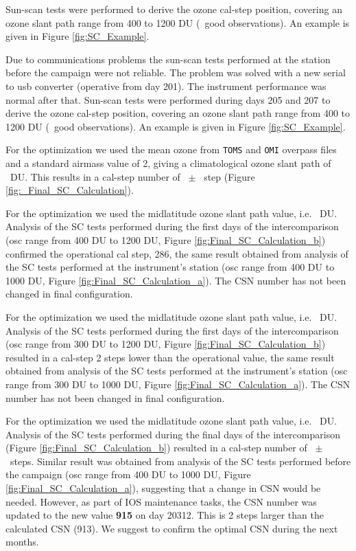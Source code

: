 Sun-scan tests were performed to derive the ozone cal-step position, covering an ozone slant path range from 400 to 1200 DU (\textbf{\numSCnew}\ good observations). An example is given in Figure \ref{fig:SC_Example}.

Due to communications problems the sun-scan tests performed at the station  before the campaign were not reliable. The problem was solved with a new serial to usb converter (operative from day 201). The instrument performance was normal after that. Sun-scan tests were performed during days 205 and 207 to derive the ozone cal-step position, covering an ozone slant path range from 400 to 1200 DU (\textbf{\numSCnew}\ good observations). An example is given in Figure \ref{fig:SC_Example}.


For the optimization we used the mean ozone from \texttt{TOMS} and \texttt{OMI} overpass files and a standard airmass value of 2, giving a climatological ozone slant path of \textbf{\STATIONOSC}\ DU. This results in a cal-step number of \textbf{\CALCSTEP}\ $\pm$ \textbf{\calsteperror}\ step (Figure \ref{fig:_Final_SC_Calculation}).

For the optimization we used the midlatitude ozone slant path value, i.e. \textbf{\STATIONOSC}\ DU. Analysis of the SC tests performed during the first days of the intercomparison (osc range from 400 DU to 1200 DU, Figure \ref{fig:Final_SC_Calculation_b}) confirmed the operational cal step, 286, the same result obtained from analysis of the SC tests performed at the instrument's station (osc range from 400 DU to 1000 DU, Figure \ref{fig:Final_SC_Calculation_a}). The CSN number has not been changed in final configuration.

For the optimization we used the midlatitude ozone slant path value, i.e. \textbf{\STATIONOSC}\ DU. Analysis of the SC tests performed during the first days of the intercomparison (osc range from 300 DU to 1200 DU, Figure \ref{fig:Final_SC_Calculation_b}) resulted in a cal-step 2 steps lower than the operational value, the same result obtained from analysis of the SC tests performed at the instrument's station (osc range from 300 DU to 1000 DU, Figure \ref{fig:Final_SC_Calculation_a}). The CSN number has not been changed in final configuration.

For the optimization we used the midlatitude ozone slant path value, i.e. \textbf{\STATIONOSC}\ DU. Analysis of the SC tests performed during the final days of the intercomparison (Figure \ref{fig:Final_SC_Calculation_b}) resulted in a cal-step number of \textbf{\CALCSTEPnew}\ $\pm$ \textbf{\calsteperrornew}\ steps. Similar result was obtained from analysis of the SC tests performed before the campaign (osc range from 400 DU to 1000 DU, Figure \ref{fig:Final_SC_Calculation_a}), suggesting that a change in CSN would be needed. However, as part of IOS maintenance tasks, the CSN number was updated to the new value \textbf{915} on day 20312. This is 2 steps larger than the calculated CSN (913). We suggest to confirm the optimal CSN during the next months.


